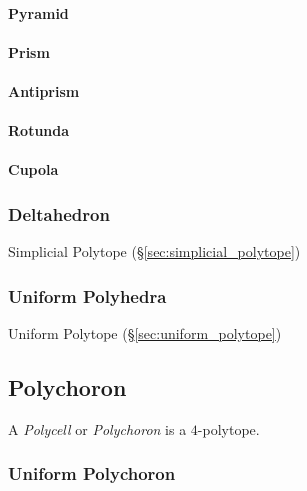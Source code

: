 \paragraph{Pyramid}\label{sec:pyramid}\hfill

\paragraph{Prism}\label{sec:prism}\hfill

\paragraph{Antiprism}\label{sec:antiprism}\hfill

\paragraph{Rotunda}\label{sec:rotunda}\hfill

\paragraph{Cupola}\label{sec:cupola}\hfill



\subsubsection{Deltahedron}\label{sec:deltahedron}

Simplicial Polytope (\S\ref{sec:simplicial_polytope})



\subsubsection{Uniform Polyhedra}\label{sec:uniform_polyhedra}

\fist Uniform Polytope (\S\ref{sec:uniform_polytope})



\subsection{Polychoron}\label{sec:polychoron}

A \emph{Polycell} or \emph{Polychoron} is a $4$-polytope.



\subsubsection{Uniform Polychoron}\label{sec:uniform_polychoron}


